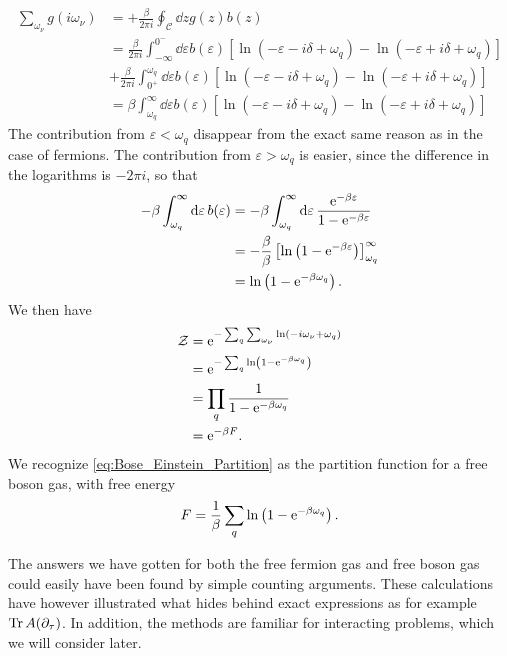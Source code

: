 \begin{align}
\sum_{\omega_\nu}g(i\omega_\nu) &= +\frac{\beta}{2\pi i}\oint_\mathcal{C}\dd{z} g(z)b(z)\nonumber \\
&= \frac{\beta}{2\pi i}\int_{-\infty}^{0^-}\dd{\varepsilon}b(\varepsilon)\left[\ln(-\varepsilon - i\delta +\omega_q)-\ln(-\varepsilon +i\delta + \omega_q)\right] \nonumber\\
&+ \frac{\beta}{2\pi i}\int_{0^+}^{\omega_q}\dd{\varepsilon}b(\varepsilon)\left[\ln(-\varepsilon - i\delta +\omega_q)-\ln(-\varepsilon +i\delta + \omega_q)\right] \nonumber\\
&= \beta\int_{\omega_q}^\infty \dd{\varepsilon}b(\varepsilon)\left[\ln(-\varepsilon - i\delta +\omega_q)-\ln(-\varepsilon +i\delta + \omega_q)\right]\label{unc:limits_integral}
\end{align}
The contribution from \(\varepsilon <\omega_q\) disappear from the exact same reason as in the case of fermions. The contribution from \(\varepsilon >\omega_q\) is easier, since the difference in the logarithms is \(-2\pi i\), so that 
\begin{align*}
-\beta\int_{\omega_q}^{\infty}\dd{\varepsilon}b(\varepsilon) &= -\beta\int_{\omega_q}^{\infty}\dd{\varepsilon}\frac{\mathrm{e}^{-\beta \varepsilon}}{1-\mathrm{e}^{-\beta \varepsilon}}\\
&= -\frac{\beta}{\beta}\left[\ln\left(1-\mathrm{e}^{-\beta \varepsilon}\right)\right]_{\omega_q}^{\infty} \\
&= \ln\left(1-\mathrm{e}^{-\beta\omega_q}\right).
\end{align*}
We then have
\begin{align}
\mathcal{Z} &= \mathrm{e}^{-\sum_{q}\sum_{\omega_\nu}\ln(-i\omega_\nu+\omega_q)} \nonumber\\
&= \mathrm{e}^{-\sum_q\ln\left(1-\mathrm{e}^{-\beta\omega_q}\right)} \nonumber \\
&= \prod_q \frac{1}{1-\mathrm{e}^{-\beta\omega_q}}\label{eq:Bose_Einstein_Partition}\\
&= \mathrm{e}^{-\beta F}. \nonumber
\end{align}
We recognize \eqref{eq:Bose_Einstein_Partition} as the partition function for a free boson gas, with free energy 
\begin{equation}
F = \frac{1}{\beta}\sum_q\ln\left(1-\mathrm{e}^{-\beta\omega_q}\right).
\end{equation}

The answers we have gotten for both the free fermion gas and free boson gas could easily have been found by simple counting arguments. These calculations have however illustrated what hides behind exact expressions as for example \(\Tr A(\partial_\tau)\). In addition, the methods are familiar for interacting problems, which we will consider later.

\begin{figure}
	\centering

\end{figure}
